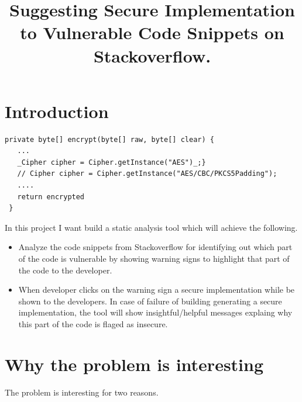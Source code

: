 \documentclass[sigconf]{acmart}
\newcommand{\note}[1]{\begin{noteBox} \textbf{Note:} #1 \end{noteBox}}
\begin{document}
\title{Suggesting Secure Implementation to Vulnerable Code Snippets on Stackoverflow.}


\maketitle
\section{Introduction}
\begin{lstlisting}[caption={A real code snippet taken from Stackoverflow. I want to build a tool which after analyzing the code snippet will highlight the part of the code that is insecure and suggest an alternative secure implementation as showed in the figure.}, label={fig:motivating-example}]
 private byte[] encrypt(byte[] raw, byte[] clear) {
   ...
   _Cipher cipher = Cipher.getInstance("AES")_;}
   // Cipher cipher = Cipher.getInstance("AES/CBC/PKCS5Padding");
   ....
   return encrypted
 }
  \end{lstlisting}
\label{into}
In this project I want build a static analysis tool which will achieve the following. 
\begin{itemize}
\item  Analyze the code snippets from Stackoverflow for identifying out which part of the code is vulnerable by showing warning signs to highlight that part of the code to the developer.
\item When developer clicks on the warning sign a secure implementation while be shown to the developers. In case of failure of building generating a secure implementation, the tool will show insightful/helpful messages explaing why this part of the code is flaged as insecure.  
\end{itemize}

\section{Why the problem is interesting}
The problem is interesting for two reasons. 
\end{document}

